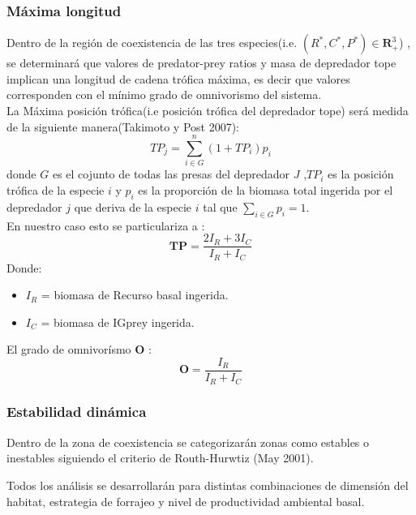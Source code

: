 \documentclass[a4paper,11pt]{article}
\begin{document}
\subsubsection{M\'axima longitud}
Dentro de la regi\'on de coexistencia de las tres especies(i.e. $(R^*,C^*,P^*) \in \mathbf{R}^3_+$) , se determinar\'a que valores de predator-prey ratios y masa de depredador tope implican una longitud de cadena tr\'ofica m\'axima, es decir que valores corresponden con el m\'inimo grado de omnivorismo del sistema.\\
La M\'axima posici\'on tr\'ofica(i.e posici\'on tr\'ofica del depredador tope) ser\'a medida de la siguiente manera(Takimoto y Post 2007):
\begin{equation} TP_j = \sum_{i \in G}^n (1+TP_i) p_i  \end{equation} donde $G$ es el cojunto de todas las presas del depredador $J$ ,$TP_i$ es la posici\'on tr\'ofica de la especie $i$ y $p_i$ es la proporci\'on de la biomasa total ingerida por el depredador $j$ que deriva de la especie $i$ tal que $ \sum_{i \in G} p_i =1 $. \\
En nuestro caso esto se particulariza a :
\begin{equation} \mathbf{TP}= \frac{2 I_R + 3 I_C}{I_R+I_C} \end{equation}
Donde:
\begin{itemize}
\item $I_R$ = biomasa de Recurso basal ingerida.
\item $I_C$ = biomasa de IGprey ingerida.
\end{itemize}
El grado de omnivor\'ismo $\mathbf{O}$ :
\begin{equation} \mathbf{O}= \frac{I_R}{I_R+I_C} \end{equation}
\subsubsection{Estabilidad din\'amica}
Dentro de la zona de coexistencia se categorizar\'an zonas como estables o inestables siguiendo el criterio de Routh-Hurwtiz (May 2001).

Todos los an\'alisis se desarrollar\'an para distintas combinaciones de dimensi\'on del habitat, estrategia de forrajeo y nivel de productividad ambiental basal.
\end{document}
